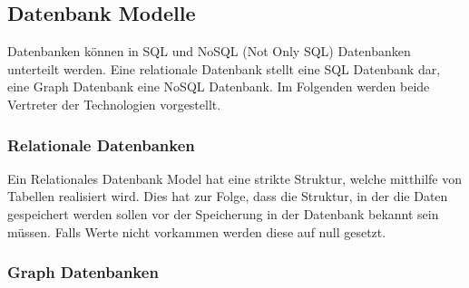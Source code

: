 
\subsection{Datenbank Modelle} %
Datenbanken können in SQL und NoSQL (Not Only SQL) Datenbanken unterteilt werden. Eine relationale Datenbank stellt eine SQL Datenbank dar, eine Graph Datenbank eine NoSQL Datenbank. Im Folgenden werden beide Vertreter der Technologien vorgestellt.
\subsubsection{Relationale Datenbanken} %
\label{sec:relationaleDatenbanken}
Ein Relationales Datenbank Model hat eine strikte Struktur, welche mitthilfe von Tabellen realisiert wird. Dies hat zur Folge, dass die Struktur, in der die Daten gespeichert werden sollen vor der Speicherung in der Datenbank bekannt sein müssen. Falls Werte nicht vorkammen werden diese auf null gesetzt. \citep{relationalDatabase}

\subsubsection{Graph Datenbanken} %
\label{sec:graphDatenbanken}



\label{sec:datenbanktypen}



